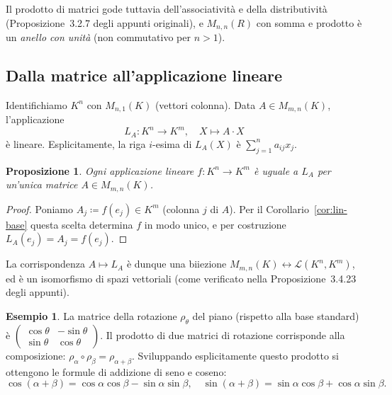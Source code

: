 \documentclass[11pt, a4paper]{book}
\theoremstyle{definition}
\newtheorem{esempio}[definizione]{Esempio}
\theoremstyle{plain}
\newtheorem{proposizione}[definizione]{Proposizione}
\theoremstyle{remark}
\begin{document}
Il prodotto di matrici gode tuttavia dell'associatività e della distributività (Proposizione~3.2.7 degli appunti originali), e $M_{n,n}(R)$ con somma e prodotto è un \emph{anello con unità} (non commutativo per $n > 1$).

\subsection{Dalla matrice all'applicazione lineare}

Identifichiamo $K^n$ con $M_{n,1}(K)$ (vettori colonna). Data $A \in M_{m,n}(K)$, l'applicazione
\[
  L_A \colon K^n \to K^m, \quad X \mapsto A \cdot X
\]
è lineare. Esplicitamente, la riga $i$-esima di $L_A(X)$ è $\sum_{j=1}^n a_{ij} x_j$.

\begin{proposizione}
\label{prop:ogni-lin-matrice}
Ogni applicazione lineare $f \colon K^n \to K^m$ è uguale a $L_A$ per un'unica matrice $A \in M_{m,n}(K)$.
\end{proposizione}

\begin{proof}
Poniamo $A_j \coloneqq f(e_j) \in K^m$ (colonna $j$ di $A$). Per il Corollario~\ref{cor:lin-base} questa scelta determina $f$ in modo unico, e per costruzione $L_A(e_j) = A_j = f(e_j)$.
\end{proof}

La corrispondenza $A \mapsto L_A$ è dunque una biiezione $M_{m,n}(K) \leftrightarrow \mathcal{L}(K^n, K^m)$, ed è un isomorfismo di spazi vettoriali (come verificato nella Proposizione~3.4.23 degli appunti).

\begin{exbox}
\begin{esempio}
La matrice della rotazione $\rho_\theta$ del piano (rispetto alla base standard) è
$\begin{pmatrix} \cos\theta & -\sin\theta \\ \sin\theta & \cos\theta \end{pmatrix}$.
Il prodotto di due matrici di rotazione corrisponde alla composizione: $\rho_\alpha \circ \rho_\beta = \rho_{\alpha+\beta}$. Sviluppando esplicitamente questo prodotto si ottengono le formule di addizione di seno e coseno:
\[
  \cos(\alpha+\beta) = \cos\alpha\cos\beta - \sin\alpha\sin\beta, \quad
  \sin(\alpha+\beta) = \sin\alpha\cos\beta + \cos\alpha\sin\beta.
\]
\end{esempio}
\end{exbox}

\end{document}
